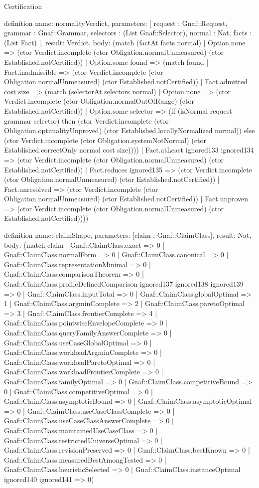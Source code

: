 \begin{lexlean}{Certification}
\begin{semanticmodule}
definition{
  name: normalityVerdict,
  parameters: [
    request : Gnaf::Request,
    grammar : Gnaf::Grammar,
    selectors : (List Gnaf::Selector),
    normal : Nat,
    facts : (List Fact)
  ],
  result: Verdict,
  body: (match (factAt facts normal)
    | Option.none => (ctor Verdict.incomplete (ctor Obligation.normalUnmeasured) (ctor Established.notCertified))
    | Option.some found => (match found
      | Fact.inadmissible => (ctor Verdict.incomplete (ctor Obligation.normalUnmeasured) (ctor Established.notCertified))
      | Fact.admitted cost size => (match (selectorAt selectors normal)
        | Option.none => (ctor Verdict.incomplete (ctor Obligation.normalOutOfRange) (ctor Established.notCertified))
        | Option.some selector => (if (isNormal request grammar selector) then (ctor Verdict.incomplete (ctor Obligation.optimalityUnproved) (ctor Established.locallyNormalized normal)) else (ctor Verdict.incomplete (ctor Obligation.systemNotNormal) (ctor Established.correctOnly normal cost size))))
      | Fact.atLeast ignored133 ignored134 => (ctor Verdict.incomplete (ctor Obligation.normalUnmeasured) (ctor Established.notCertified))
      | Fact.reduces ignored135 => (ctor Verdict.incomplete (ctor Obligation.normalUnmeasured) (ctor Established.notCertified))
      | Fact.unresolved => (ctor Verdict.incomplete (ctor Obligation.normalUnmeasured) (ctor Established.notCertified))
      | Fact.unproven => (ctor Verdict.incomplete (ctor Obligation.normalUnmeasured) (ctor Established.notCertified))))
}

definition{
  name: claimShape,
  parameters: [claim : Gnaf::ClaimClass],
  result: Nat,
  body: (match claim
    | Gnaf::ClaimClass.exact => 0
    | Gnaf::ClaimClass.normalForm => 0
    | Gnaf::ClaimClass.canonical => 0
    | Gnaf::ClaimClass.representationMinimal => 0
    | Gnaf::ClaimClass.comparisonTheorem => 0
    | Gnaf::ClaimClass.profileDefinedComparison ignored137 ignored138 ignored139 => 0
    | Gnaf::ClaimClass.inputTotal => 0
    | Gnaf::ClaimClass.globalOptimal => 1
    | Gnaf::ClaimClass.argminComplete => 2
    | Gnaf::ClaimClass.paretoOptimal => 3
    | Gnaf::ClaimClass.frontierComplete => 4
    | Gnaf::ClaimClass.pointwiseEnvelopeComplete => 0
    | Gnaf::ClaimClass.queryFamilyAnswerComplete => 0
    | Gnaf::ClaimClass.useCaseGlobalOptimal => 0
    | Gnaf::ClaimClass.workloadArgminComplete => 0
    | Gnaf::ClaimClass.workloadParetoOptimal => 0
    | Gnaf::ClaimClass.workloadFrontierComplete => 0
    | Gnaf::ClaimClass.familyOptimal => 0
    | Gnaf::ClaimClass.competitiveBound => 0
    | Gnaf::ClaimClass.competitiveOptimal => 0
    | Gnaf::ClaimClass.asymptoticBound => 0
    | Gnaf::ClaimClass.asymptoticOptimal => 0
    | Gnaf::ClaimClass.useCaseClassComplete => 0
    | Gnaf::ClaimClass.useCaseClassAnswerComplete => 0
    | Gnaf::ClaimClass.maintainedUseCaseClass => 0
    | Gnaf::ClaimClass.restrictedUniverseOptimal => 0
    | Gnaf::ClaimClass.revisionPreserved => 0
    | Gnaf::ClaimClass.bestKnown => 0
    | Gnaf::ClaimClass.measuredBestAmongTested => 0
    | Gnaf::ClaimClass.heuristicSelected => 0
    | Gnaf::ClaimClass.instanceOptimal ignored140 ignored141 => 0)
}


\end{semanticmodule}
\end{lexlean}
